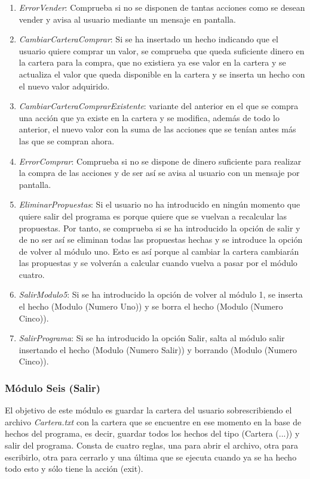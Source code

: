 \documentclass[12pt]{article}
\begin{document}
\begin{enumerate}
\item \textit{ErrorVender}: Comprueba si no se disponen de tantas acciones como se desean vender y avisa al usuario mediante un mensaje en pantalla.
\item \textit{CambiarCarteraComprar}: Si se ha insertado un hecho indicando que el usuario quiere comprar un valor, se comprueba que queda suficiente dinero en la cartera para la compra, que no existiera ya ese valor en la cartera y se actualiza el valor que queda disponible en la cartera y se inserta un hecho con el nuevo valor adquirido.
\item \textit{CambiarCarteraComprarExistente}: variante del anterior en el que se compra una acción que ya existe en la cartera y se modifica, además de todo lo anterior, el nuevo valor con la suma de las acciones que se tenían antes más las que se compran ahora.
\item \textit{ErrorComprar}: Comprueba si no se dispone de dinero suficiente para realizar la compra de las acciones y de ser así se avisa al usuario con un mensaje por pantalla.
\item \textit{EliminarPropuestas}: Si el usuario no ha introducido en ningún momento que quiere salir del programa es porque quiere que se vuelvan a recalcular las propuestas. Por tanto, se comprueba si se ha introducido la opción de salir y de no ser así se eliminan todas las propuestas hechas y se introduce la opción de volver al módulo uno. Esto es así porque al cambiar la cartera cambiarán las propuestas y se volverán a calcular cuando vuelva a pasar por el módulo cuatro.
\item \textit{SalirModulo5}: Si se ha introducido la opción de volver al módulo 1, se inserta el hecho (Modulo (Numero Uno)) y se borra el hecho (Modulo (Numero Cinco)).
\item \textit{SalirPrograma}: Si se ha introducido la opción Salir, salta al módulo salir insertando el hecho (Modulo (Numero Salir)) y borrando (Modulo (Numero Cinco)).
\end{enumerate}

\subsubsection{Módulo Seis (Salir)}
El objetivo de este módulo es guardar la cartera del usuario sobrescribiendo el archivo \textit{Cartera.txt} con la cartera que se encuentre en ese momento en la base de hechos del programa, es decir, guardar todos los hechos del tipo (Cartera (...)) y salir del programa. Consta de cuatro reglas, una para abrir el archivo, otra para escribirlo, otra para cerrarlo y una última que se ejecuta cuando ya se ha hecho todo esto y sólo tiene la acción (exit).
\end{document}
